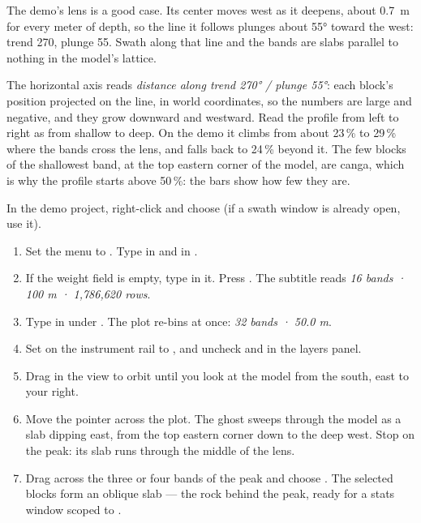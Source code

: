 The demo's lens is a good case. Its center moves west as it deepens, about 0.7~m for every meter of depth, so the line it follows plunges about 55° toward the west: trend 270, plunge 55. Swath along that line and the bands are slabs parallel to nothing in the model's lattice.


The horizontal axis reads \emph{distance along trend 270° / plunge 55°}: each block's position projected on the line, in world coordinates, so the numbers are large and negative, and they grow downward and westward. Read the profile from left to right as from shallow to deep. On the demo it climbs from about 23\,\% to 29\,\% where the bands cross the lens, and falls back to 24\,\% beyond it. The few blocks of the shallowest band, at the top eastern corner of the model, are canga, which is why the profile starts above 50\,\%: the bars show how few they are.

\begin{tryit}
In the demo project, right-click  and choose  (if a swath window is already open, use it).
\begin{enumerate}
\item Set the  menu to . Type  in  and  in .
\item If the weight field is empty, type  in it. Press . The subtitle reads \emph{16 bands · 100 m · 1,786,620 rows}.
\item Type  in  under . The plot re-bins at once: \emph{32 bands · 50.0 m}.
\item Set  on the instrument rail to , and uncheck  and  in the layers panel.
\item Drag in the view to orbit until you look at the model from the south, east to your right.
\item Move the pointer across the plot. The ghost sweeps through the model as a slab dipping east, from the top eastern corner down to the deep west. Stop on the peak: its slab runs through the middle of the lens.
\item Drag across the three or four bands of the peak and choose . The selected blocks form an oblique slab — the rock behind the peak, ready for a stats window scoped to .
\end{enumerate}
\end{tryit}

